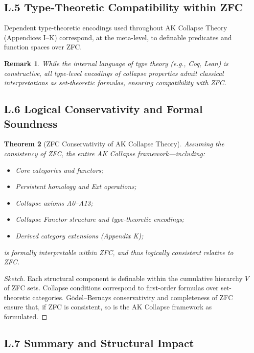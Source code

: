\documentclass[11pt]{article}
\newtheorem{theorem}{Theorem}[section]
\newtheorem{remark}[theorem]{Remark}
\begin{document}
\subsection*{L.5 Type-Theoretic Compatibility within ZFC}

Dependent type-theoretic encodings used throughout AK Collapse Theory (Appendices I–K) correspond, at the meta-level, to definable predicates and function spaces over ZFC.

\begin{remark}
While the internal language of type theory (e.g., Coq, Lean) is constructive, all type-level encodings of collapse properties admit classical interpretations as set-theoretic formulas, ensuring compatibility with ZFC.
\end{remark}

\subsection*{L.6 Logical Conservativity and Formal Soundness}

\begin{theorem}[ZFC Conservativity of AK Collapse Theory]
Assuming the consistency of ZFC, the entire AK Collapse framework—including:

\begin{itemize}
    \item Core categories and functors;
    \item Persistent homology and Ext operations;
    \item Collapse axioms A0–A13;
    \item Collapse Functor structure and type-theoretic encodings;
    \item Derived category extensions (Appendix K);
\end{itemize}

is formally interpretable within ZFC, and thus logically consistent relative to ZFC.
\end{theorem}

\begin{proof}[Sketch]
Each structural component is definable within the cumulative hierarchy \( V \) of ZFC sets.  
Collapse conditions correspond to first-order formulas over set-theoretic categories.  
Gödel–Bernays conservativity and completeness of ZFC ensure that, if ZFC is consistent, so is the AK Collapse framework as formulated.
\end{proof}

\subsection*{L.7 Summary and Structural Impact}
\end{document}
